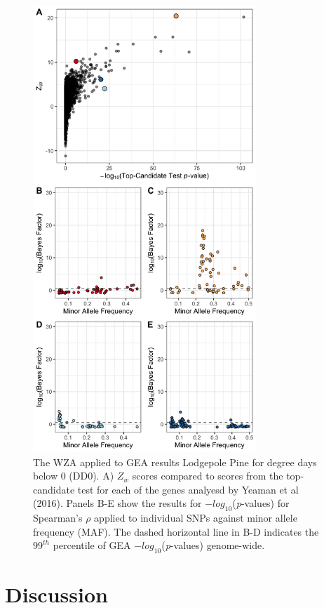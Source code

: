 \documentclass[11pt,twoside,lineno]{GSA_format}
\begin{document}
\begin{figure}
  \includegraphics[width=0.75\textwidth,height=0.75\textheight,keepaspectratio]{../dataAnalsis/Z_v_MAF_DD0.png}
  \caption{The WZA applied to GEA results Lodgepole Pine for degree days below 0 (DD0). A) $Z_w$ scores compared to scores from the top-candidate test for each of the genes analyesd by Yeaman et al (2016). Panels B-E show the results for $-log_{10}$(\textit{p}-values) for Spearman's $\rho$ applied to individual SNPs against minor allele frequency (MAF). The dashed horizontal line in B-D indicates the $99^{th}$ percentile of GEA $-log_{10}$(\textit{p}-values) genome-wide.}

  \label{fig:lodgepole}
\end{figure}


\section{Discussion}
\end{document}
